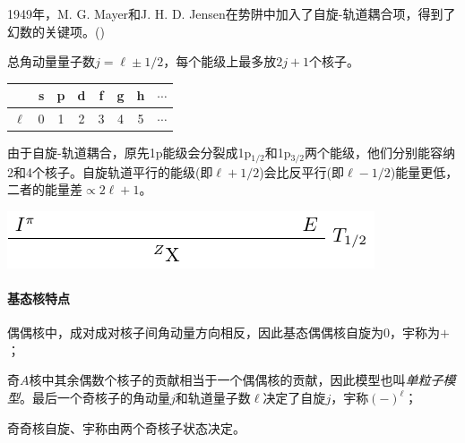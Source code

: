 1949年，M. G. Mayer和J. H. D. Jensen在势阱中加入了自旋-轨道耦合项，得到了幻数的关键项。()

总角动量量子数$j=\ell\pm 1/2$，每个能级上最多放$2j+1$个核子。
\begin{center}
	\begin{tabular}{cccccccc}
		\toprule
		&s&p&d&f&g&h&$\cdots$\\
		\midrule
		$\ell$&0&1&2&3&4&5&$\cdots$\\
		\bottomrule
	\end{tabular}
\end{center}
由于自旋-轨道耦合，原先1p能级会分裂成1p$_{1/2}$和1p$_{3/2}$两个能级，他们分别能容纳2和4个核子。自旋轨道平行的能级(即$\ell+1/2$)会比反平行(即$\ell-1/2$)能量更低，二者的能量差$\propto 2\ell+1$。
\begin{center}
	\includegraphics[page=2]{figures/tikz/layouts.pdf}
\end{center}
\paragraph{基态核特点}
\begin{compactitem}
	\item 偶偶核中，成对成对核子间角动量方向相反，因此基态偶偶核自旋为0，宇称为$+$；
	\item 奇$A$核中其余偶数个核子的贡献相当于一个偶偶核的贡献，因此模型也叫\textit{单粒子模型}。最后一个奇核子的角动量$j$和轨道量子数$\ell$决定了自旋$j$，宇称$(-)^\ell$；
	\item 奇奇核自旋、宇称由两个奇核子状态决定。
\end{compactitem}

